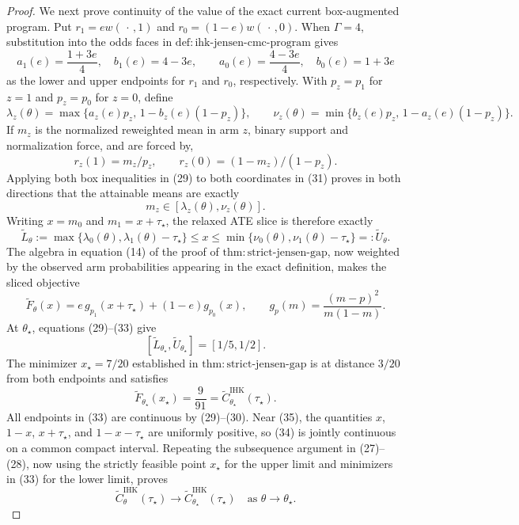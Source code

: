 \documentclass{article}
\begin{document}
\begin{proof}
We next prove continuity of the value of the exact current box-augmented program.  Put \(r_1=ew(\,\cdot\,,1)\) and \(r_0=(1-e)w(\,\cdot\,,0)\).  When \(\Gamma=4\), substitution into the odds faces in \(\mathrm{def{:}ihk\mbox{-}jensen\mbox{-}cmc\mbox{-}program}\) gives
\[
a_1(e)=\frac{1+3e}{4},\quad b_1(e)=4-3e,
\qquad
a_0(e)=\frac{4-3e}{4},\quad b_0(e)=1+3e
\tag{29}
\]
as the lower and upper endpoints for \(r_1\) and \(r_0\), respectively.  With \(p_z=p_1\) for \(z=1\) and \(p_z=p_0\) for \(z=0\), define
\[
\lambda_z(\theta)
=\max\{a_z(e)p_z,\,1-b_z(e)(1-p_z)\},
\qquad
\nu_z(\theta)
=\min\{b_z(e)p_z,\,1-a_z(e)(1-p_z)\}.
\tag{30}
\]
If \(m_z\) is the normalized reweighted mean in arm \(z\), binary support and normalization force, and are forced by,
\[
r_z(1)=m_z/p_z,
\qquad r_z(0)=(1-m_z)/(1-p_z).
\tag{31}
\]
Applying both box inequalities in (29) to both coordinates in (31) proves in both directions that the attainable means are exactly
\[
m_z\in[\lambda_z(\theta),\nu_z(\theta)].
\tag{32}
\]
Writing \(x=m_0\) and \(m_1=x+\tau_\star\), the relaxed ATE slice is therefore exactly
\[
\widetilde L_\theta
:=\max\{\lambda_0(\theta),\lambda_1(\theta)-\tau_\star\}
\leq x\leq
\min\{\nu_0(\theta),\nu_1(\theta)-\tau_\star\}
=:\widetilde U_\theta.
\tag{33}
\]
The algebra in equation (14) of the proof of \(\mathrm{thm{:}strict\mbox{-}jensen\mbox{-}gap}\), now weighted by the observed arm probabilities appearing in the exact definition, makes the sliced objective
\[
\widetilde F_\theta(x)
=e\,g_{p_1}(x+\tau_\star)+(1-e)g_{p_0}(x),
\qquad
g_p(m)=\frac{(m-p)^2}{m(1-m)}.
\tag{34}
\]
At \(\theta_\star\), equations (29)--(33) give
\[
[\widetilde L_{\theta_\star},\widetilde U_{\theta_\star}]=[1/5,1/2].
\tag{35}
\]
The minimizer \(x_\star=7/20\) established in \(\mathrm{thm{:}strict\mbox{-}jensen\mbox{-}gap}\) is at distance \(3/20\) from both endpoints and satisfies
\[
\widetilde F_{\theta_\star}(x_\star)
=\frac9{91}
=\widetilde C^{\mathrm{IHK}}_{\theta_\star}(\tau_\star).
\tag{36}
\]
All endpoints in (33) are continuous by (29)--(30).  Near (35), the quantities \(x\), \(1-x\), \(x+\tau_\star\), and \(1-x-\tau_\star\) are uniformly positive, so (34) is jointly continuous on a common compact interval.  Repeating the subsequence argument in (27)--(28), now using the strictly feasible point \(x_\star\) for the upper limit and minimizers in (33) for the lower limit, proves
\[
\widetilde C^{\mathrm{IHK}}_\theta(\tau_\star)
\longrightarrow
\widetilde C^{\mathrm{IHK}}_{\theta_\star}(\tau_\star)
\quad\text{as }\theta\to\theta_\star.
\tag{37}
\]


\end{proof}
\end{document}
